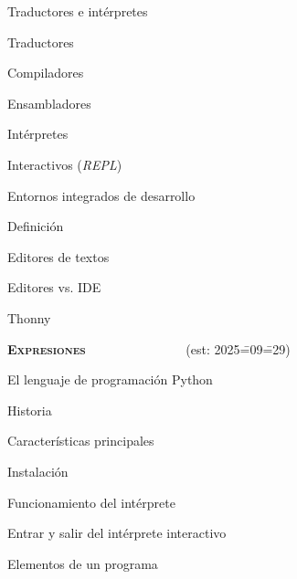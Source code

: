 \begin{longenum}
\begin{longenum}
\begin{longenum}
        \end{longenum}
        \item Traductores e intérpretes
        \begin{longenum}
            \item Traductores
            \item Compiladores
            \begin{longenum}
                \item Ensambladores
            \end{longenum}
            \item Intérpretes
            \begin{longenum}
                \item Interactivos (\textit{REPL})
            \end{longenum}
        \end{longenum}
        \item Entornos integrados de desarrollo
        \begin{longenum}
            \item Definición
            \item Editores de textos
            \item Editores vs. IDE
            \item Thonny
        \end{longenum}
    \end{longenum}
    \item \textbf{\textsc{Expresiones}} \ \ \ \ \ \ \ \ \ \ \ \ \ \ \ (est: 2025\==09\==29)
    \begin{longenum}
        \item El lenguaje de programación Python
        \begin{longenum}
            \item Historia
            \item Características principales
            \item Instalación
            \item Funcionamiento del intérprete
            \begin{longenum}
                \item Entrar y salir del intérprete interactivo
            \end{longenum}
        \end{longenum}
        \item Elementos de un programa

\end{longenum}
\end{longenum}
